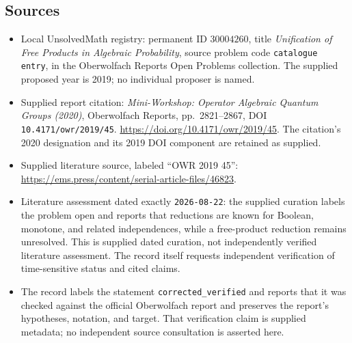 \documentclass[11pt]{article}
\begin{document}
\subsection{Sources}
\begin{itemize}
\item Local UnsolvedMath registry: permanent ID \(30004260\), title \emph{Unification of Free Products in Algebraic Probability}, source problem code \texttt{catalogue entry}, in the Oberwolfach Reports Open Problems collection. The supplied proposed year is 2019; no individual proposer is named.
\item Supplied report citation: \emph{Mini-Workshop: Operator Algebraic Quantum Groups (2020)}, Oberwolfach Reports, pp.\ 2821--2867, DOI \texttt{10.4171/owr/2019/45}. \url{https://doi.org/10.4171/owr/2019/45}. The citation's 2020 designation and its 2019 DOI component are retained as supplied.
\item Supplied literature source, labeled ``OWR 2019 45'': \url{https://ems.press/content/serial-article-files/46823}.
\item Literature assessment dated exactly \texttt{2026-08-22}: the supplied curation labels the problem open and reports that reductions are known for Boolean, monotone, and related independences, while a free-product reduction remains unresolved. This is supplied dated curation, not independently verified literature assessment. The record itself requests independent verification of time-sensitive status and cited claims.
\item The record labels the statement \texttt{corrected\_verified} and reports that it was checked against the official Oberwolfach report and preserves the report's hypotheses, notation, and target. That verification claim is supplied metadata; no independent source consultation is asserted here.
\end{itemize}
\end{document}
